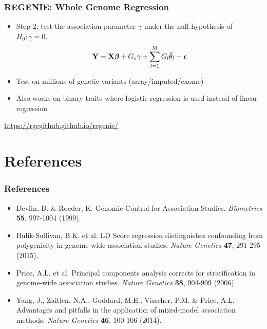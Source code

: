 \documentclass{beamer}
\newcommand{\bepsilon}{\mbox{\boldmath$\epsilon$}}
\begin{document}
\begin{frame}
	\frametitle{\bf  REGENIE: Whole Genome Regression}
	\begin{itemize}
		\item Step 2:  test the association parameter $\gamma$ under the null hypothesis of $H_0: \gamma=0.$
		$$ \mathbf{Y}= \mathbf{X}\boldsymbol{\beta} + G_s\gamma+ \sum_{l=1}^MG_l\hat\theta_l + \bepsilon  $$
		\item Test on millions of genetic variants (array/imputed/exome)
		\item Also works on binary traits where logistic regression is used instead of linear regression
		\end{itemize}
\centering\url{https://rgcgithub.github.io/regenie/}
\end{frame}


\section{References}


\begin{frame}
\frametitle{\bf References}
\begin{itemize}

\item  Devlin, B. \& Roeder, K. Genomic Control for Association Studies. \textit{Biometrics} \textbf{55}, 997-1004 (1999).
\item Bulik-Sullivan, B.K. et al. LD Score regression distinguishes confounding from polygenicity in genome-wide association studies. \textit{Nature Genetics} \textbf{47}, 291-295 (2015).
\item Price, A.L. et al. Principal components analysis corrects for stratification in genome-wide association studies.\textit{ Nature Genetics} \textbf{38}, 904-909 (2006).
\item Yang, J., Zaitlen, N.A., Goddard, M.E., Visscher, P.M. \& Price, A.L. Advantages and pitfalls in the application of mixed-model association methods. \textit{Nature Genetics} \textbf{46}, 100-106 (2014).

\end{itemize}

\end{frame}
\end{document}
